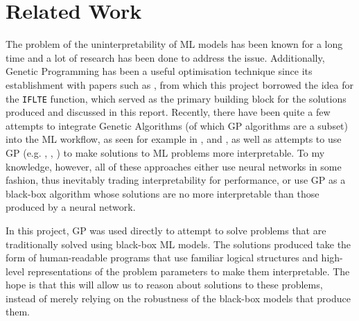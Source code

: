 \section{Related Work}
The problem of the uninterpretability of ML models has been known for a long time and a lot of research has been done to address the issue. Additionally, Genetic Programming has been a useful optimisation technique since its establishment with papers such as \cite{koza}, from which this project borrowed the idea for the \verb+IFLTE+ function, which served as the primary building block for the solutions produced and discussed in this report. Recently, there have been quite a few attempts to integrate Genetic Algorithms (of which GP algorithms are a subset) into the ML workflow, as seen for example in \cite{relatedwork1}, \cite{relatedwork2} and \cite{relatedwork3}, as well as attempts to use GP (e.g. \cite{gprl}, \cite{pirl}, \cite{atari}) to make solutions to ML problems more interpretable. To my knowledge, however, all of these approaches either use neural networks in some fashion, thus inevitably trading interpretability for performance, or use GP as a black-box algorithm whose solutions are no more interpretable than those produced by a neural network.

In this project, GP was used directly to attempt to solve problems that are traditionally solved using black-box ML models. The solutions produced take the form of human-readable programs that use familiar logical structures and high-level representations of the problem parameters to make them interpretable. The hope is that this will allow us to reason about solutions to these problems, instead of merely relying on the robustness of the black-box models that produce them.
